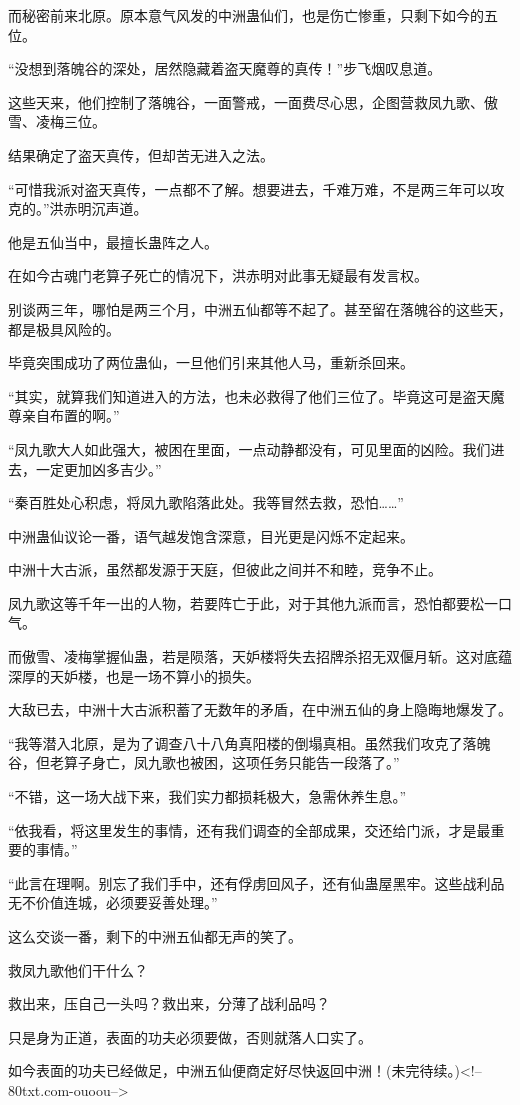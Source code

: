 \begin{this_body}
而秘密前来北原。原本意气风发的中洲蛊仙们，也是伤亡惨重，只剩下如今的五位。

“没想到落魄谷的深处，居然隐藏着盗天魔尊的真传！”步飞烟叹息道。

这些天来，他们控制了落魄谷，一面警戒，一面费尽心思，企图营救凤九歌、傲雪、凌梅三位。

结果确定了盗天真传，但却苦无进入之法。

“可惜我派对盗天真传，一点都不了解。想要进去，千难万难，不是两三年可以攻克的。”洪赤明沉声道。

他是五仙当中，最擅长蛊阵之人。

在如今古魂门老算子死亡的情况下，洪赤明对此事无疑最有发言权。

别谈两三年，哪怕是两三个月，中洲五仙都等不起了。甚至留在落魄谷的这些天，都是极具风险的。

毕竟突围成功了两位蛊仙，一旦他们引来其他人马，重新杀回来。

“其实，就算我们知道进入的方法，也未必救得了他们三位了。毕竟这可是盗天魔尊亲自布置的啊。”

“凤九歌大人如此强大，被困在里面，一点动静都没有，可见里面的凶险。我们进去，一定更加凶多吉少。”

“秦百胜处心积虑，将凤九歌陷落此处。我等冒然去救，恐怕……”

中洲蛊仙议论一番，语气越发饱含深意，目光更是闪烁不定起来。

中洲十大古派，虽然都发源于天庭，但彼此之间并不和睦，竞争不止。

凤九歌这等千年一出的人物，若要阵亡于此，对于其他九派而言，恐怕都要松一口气。

而傲雪、凌梅掌握仙蛊，若是陨落，天妒楼将失去招牌杀招无双偃月斩。这对底蕴深厚的天妒楼，也是一场不算小的损失。

大敌已去，中洲十大古派积蓄了无数年的矛盾，在中洲五仙的身上隐晦地爆发了。

“我等潜入北原，是为了调查八十八角真阳楼的倒塌真相。虽然我们攻克了落魄谷，但老算子身亡，凤九歌也被困，这项任务只能告一段落了。”

“不错，这一场大战下来，我们实力都损耗极大，急需休养生息。”

“依我看，将这里发生的事情，还有我们调查的全部成果，交还给门派，才是最重要的事情。”

“此言在理啊。别忘了我们手中，还有俘虏回风子，还有仙蛊屋黑牢。这些战利品无不价值连城，必须要妥善处理。”

这么交谈一番，剩下的中洲五仙都无声的笑了。

救凤九歌他们干什么？

救出来，压自己一头吗？救出来，分薄了战利品吗？

只是身为正道，表面的功夫必须要做，否则就落人口实了。

如今表面的功夫已经做足，中洲五仙便商定好尽快返回中洲！(未完待续。)<!--80txt.com-ouoou-->

\end{this_body}

